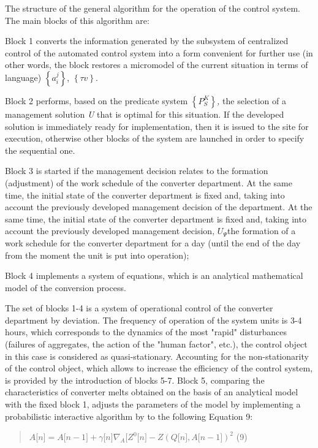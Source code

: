 The structure of the general algorithm for the operation of the control
system. The main blocks of this algorithm are:

Block 1 converts the information generated by the subsystem of
centralized control of the automated control system into a form
convenient for further use (in other words, the block restores a
micromodel of the current situation in terms of language)
\(\left\{ a_{i}^{j} \right\}\), \(\left\{ \tau v \right\}\).

Block 2 performs, based on the predicate system
\(\left\{ P_{S}^{K} \right\}\)\emph{,} the selection of a management
solution \emph{U} that is optimal for this situation. If the developed
solution is immediately ready for implementation, then it is issued to
the site for execution, otherwise other blocks of the system are
launched in order to specify the sequential one.

Block 3 is started if the management decision relates to the formation
(adjustment) of the work schedule of the converter department. At the
same time, the initial state of the converter department is fixed and,
taking into account the previously developed management decision of the
department. At the same time, the initial state of the converter
department is fixed and, taking into account the previously developed
management decision, \(U_{\Psi}\)the formation of a work schedule for
the converter department for a day (until the end of the day from the
moment the unit is put into operation);

Block 4 implements a system of equations, which is an analytical
mathematical model of the conversion process.

The set of blocks 1-4 is a system of operational control of the
converter department by deviation. The frequency of operation of the
system units is 3-4 hours, which corresponds to the dynamics of the most
"rapid" disturbances (failures of aggregates, the action of the "human
factor", etc.), the control object in this case is considered as
quasi-stationary. Accounting for the non-stationarity of the control
object, which allows to increase the efficiency of the control system,
is provided by the introduction of blocks 5-7. Block 5, comparing the
characteristics of converter melts obtained on the basis of an
analytical model with the fixed block 1, adjusts the parameters of the
model by implementing a probabilistic interactive algorithm by to the
following Equation 9:

\begin{quote}
\(A\lbrack n\rbrack = A\lbrack n - 1\rbrack + \gamma\lbrack n\rbrack\nabla_{A}\lbrack Z^{0}\lbrack n\rbrack - Z(Q\lbrack n\rbrack,A\lbrack n - 1\rbrack)^{2}\)
(9)
\end{quote}

